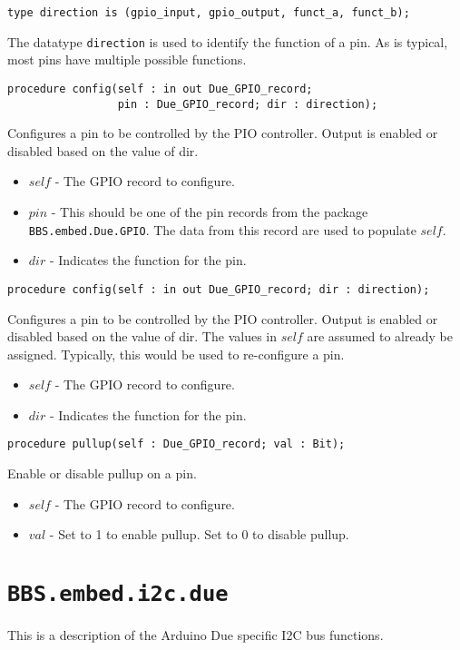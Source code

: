 \documentclass[10pt, openany]{book}
\newcommand{\indextype}[1]{\index[type]{#1}}
\newcommand{\indexfunc}[1]{\index[func]{#1}}
\newcommand{\package}[1]{\texttt{#1}}
\newcommand{\datatype}[1]{\texttt{#1}}
\begin{document}
\begin{lstlisting}
type direction is (gpio_input, gpio_output, funct_a, funct_b);
\end{lstlisting}
\indextype{direction}
The datatype \datatype{direction} is used to identify the function of a pin.  As is typical, most pins have multiple possible functions.

\begin{lstlisting}
procedure config(self : in out Due_GPIO_record;
                 pin : Due_GPIO_record; dir : direction);
\end{lstlisting}
\indexfunc{config}
Configures a pin to be controlled by the PIO controller.  Output is enabled or disabled based on the value of dir.
\begin{itemize}
  \item $self$ - The GPIO record to configure.
  \item $pin$ - This should be one of the pin records from the package \package{BBS.embed.Due.GPIO}.  The data from this record are used to populate $self$.
  \item $dir$ - Indicates the function for the pin.
\end{itemize}

\begin{lstlisting}
procedure config(self : in out Due_GPIO_record; dir : direction);
\end{lstlisting}
\indexfunc{config}
Configures a pin to be controlled by the PIO controller.  Output is enabled or disabled based on the value of dir.  The values in $self$ are assumed to already be assigned.  Typically, this would be used to re-configure a pin.
\begin{itemize}
  \item $self$ - The GPIO record to configure.
  \item $dir$ - Indicates the function for the pin.
\end{itemize}

\begin{lstlisting}
procedure pullup(self : Due_GPIO_record; val : Bit);
\end{lstlisting}
\indexfunc{pullup}
Enable or disable pullup on a pin.
\begin{itemize}
  \item $self$ - The GPIO record to configure.
  \item $val$ - Set to 1 to enable pullup.  Set to 0 to disable pullup.
\end{itemize}

\section{\package{BBS.embed.i2c.due}}
This is a description of the Arduino Due specific I2C bus functions.
\end{document}
